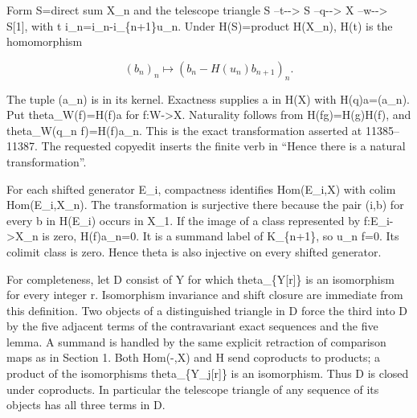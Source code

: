 \documentclass[11pt]{article}
\begin{document}
Form S\allowbreak{}=direct sum X\_\allowbreak{}n and the telescope triangle S --t-\allowbreak{}-> S --q-\allowbreak{}-> X --w-\allowbreak{}-> S[1]\allowbreak{},\allowbreak{} with t i\_\allowbreak{}n\allowbreak{}=i\_\allowbreak{}n-i\_\allowbreak{}\{n\allowbreak{}+1\}u\_\allowbreak{}n. Under H(S)\allowbreak{}\allowbreak{}=product H(X\_\allowbreak{}n)\allowbreak{},\allowbreak{} H(t)\allowbreak{} is the homomorphism

\[
 (b_n)_n\longmapsto
           (b_n-H(u_n)b_{n+1})_n .
\]

The tuple (a\_\allowbreak{}n)\allowbreak{} is in its kernel. Exactness supplies a in H(X)\allowbreak{} with H(q)\allowbreak{}a\allowbreak{}=(a\_\allowbreak{}n)\allowbreak{}. Put theta\_\allowbreak{}W(f)\allowbreak{}\allowbreak{}=H(f)\allowbreak{}a for f:\allowbreak{}W\allowbreak{}->X. Naturality follows from H(fg)\allowbreak{}\allowbreak{}=H(g)\allowbreak{}H(f)\allowbreak{},\allowbreak{} and theta\_\allowbreak{}W(q\_\allowbreak{}n f)\allowbreak{}\allowbreak{}=H(f)\allowbreak{}a\_\allowbreak{}n. This is the exact transformation asserted at 11385–\allowbreak{}11387. The requested copyedit inserts the finite verb in ``Hence there is a natural transformation''.

For each shifted generator E\_\allowbreak{}i,\allowbreak{} compactness identifies Hom(E\_\allowbreak{}i,\allowbreak{}X)\allowbreak{} with colim Hom(E\_\allowbreak{}i,\allowbreak{}X\_\allowbreak{}n)\allowbreak{}. The transformation is surjective there because the pair (i,\allowbreak{}b)\allowbreak{} for every b in H(E\_\allowbreak{}i)\allowbreak{} occurs in X\_\allowbreak{}1. If the image of a class represented by f:\allowbreak{}E\_\allowbreak{}i\allowbreak{}->X\_\allowbreak{}n is zero,\allowbreak{} H(f)\allowbreak{}a\_\allowbreak{}n\allowbreak{}=0. It is a summand label of K\_\allowbreak{}\{n\allowbreak{}+1\},\allowbreak{} so u\_\allowbreak{}n f\allowbreak{}=0. Its colimit class is zero. Hence theta is also injective on every shifted generator.

For completeness,\allowbreak{} let D\textquotesingle{} consist of Y for which theta\_\allowbreak{}\{Y[r]\allowbreak{}\} is an isomorphism for every integer r. Isomorphism invariance and shift closure are immediate from this definition. Two objects of a distinguished triangle in D\textquotesingle{} force the third into D\textquotesingle{} by the five adjacent terms of the contravariant exact sequences and the five lemma. A summand is handled by the same explicit retraction of comparison maps as in Section 1. Both Hom(-,\allowbreak{}X)\allowbreak{} and H send coproducts to products; a product of the isomorphisms theta\_\allowbreak{}\{Y\_\allowbreak{}j[r]\allowbreak{}\} is an isomorphism. Thus D\textquotesingle{} is closed under coproducts. In particular the telescope triangle of any sequence of its objects has all three terms in D\textquotesingle.
\end{document}

